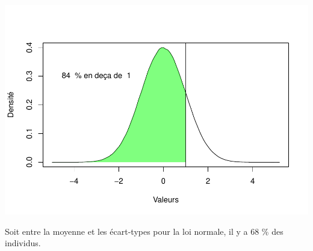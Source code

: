 \documentclass[
]{book}
\begin{document}
\includegraphics{_main_files/figure-latex/unnamed-chunk-13-1.pdf}

Soit entre la moyenne et les écart-types pour la loi normale, il y a
68 \% des individus.
\end{document}
